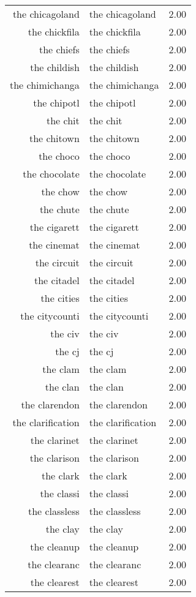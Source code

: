 \begin{table}[ht]
\begin{tabular}{rlr}
  the chicagoland & the chicagoland & 2.00 \\ 
  the chickfila & the chickfila & 2.00 \\ 
  the chiefs & the chiefs & 2.00 \\ 
  the childish & the childish & 2.00 \\ 
  the chimichanga & the chimichanga & 2.00 \\ 
  the chipotl & the chipotl & 2.00 \\ 
  the chit & the chit & 2.00 \\ 
  the chitown & the chitown & 2.00 \\ 
  the choco & the choco & 2.00 \\ 
  the chocolate & the chocolate & 2.00 \\ 
  the chow & the chow & 2.00 \\ 
  the chute & the chute & 2.00 \\ 
  the cigarett & the cigarett & 2.00 \\ 
  the cinemat & the cinemat & 2.00 \\ 
  the circuit & the circuit & 2.00 \\ 
  the citadel & the citadel & 2.00 \\ 
  the cities & the cities & 2.00 \\ 
  the citycounti & the citycounti & 2.00 \\ 
  the civ & the civ & 2.00 \\ 
  the cj & the cj & 2.00 \\ 
  the clam & the clam & 2.00 \\ 
  the clan & the clan & 2.00 \\ 
  the clarendon & the clarendon & 2.00 \\ 
  the clarification & the clarification & 2.00 \\ 
  the clarinet & the clarinet & 2.00 \\ 
  the clarison & the clarison & 2.00 \\ 
  the clark & the clark & 2.00 \\ 
  the classi & the classi & 2.00 \\ 
  the classless & the classless & 2.00 \\ 
  the clay & the clay & 2.00 \\ 
  the cleanup & the cleanup & 2.00 \\ 
  the clearanc & the clearanc & 2.00 \\ 
  the clearest & the clearest & 2.00 \\ 

\end{tabular}
\end{table}
